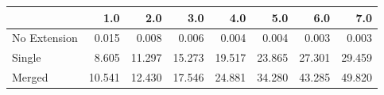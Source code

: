 \begin{tabular}{lrrrrrrr}
\toprule
{} &    1.0 &    2.0 &    3.0 &    4.0 &    5.0 &    6.0 &    7.0 \\
\midrule
No Extension &  0.015 &  0.008 &  0.006 &  0.004 &  0.004 &  0.003 &  0.003 \\
Single       &  8.605 & 11.297 & 15.273 & 19.517 & 23.865 & 27.301 & 29.459 \\
Merged       & 10.541 & 12.430 & 17.546 & 24.881 & 34.280 & 43.285 & 49.820 \\
\bottomrule
\end{tabular}
